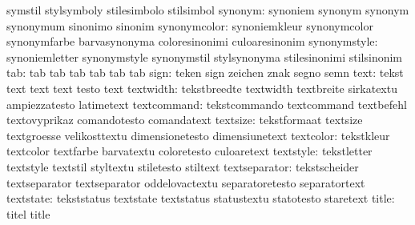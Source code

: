                            symstil                   stylsymboly
                           stilesimbolo              stilsimbol
                  synonym: synoniem                  synonym
                           synonym                   synonymum
                           sinonimo                  sinonim
             synonymcolor: synoniemkleur             synonymcolor
                           synonymfarbe              barvasynonyma
                           coloresinonimi            culoaresinonim
             synonymstyle: synoniemletter            synonymstyle
                           synonymstil               stylsynonyma
                           stilesinonimi             stilsinonim
                      tab: tab                       tab
                           tab                       tab
                           tab                       tab
                     sign: teken                     sign
                           zeichen                   znak
                           segno                     semn
                     text: tekst                     text
                           text                      text
                           testo                     text
                textwidth: tekstbreedte              textwidth
                           textbreite                sirkatextu
                           ampiezzatesto             latimetext
              textcommand: tekstcommando             textcommand
                           textbefehl                textovyprikaz
                           comandotesto              comandatext
                 textsize: tekstformaat              textsize
                           textgroesse               velikosttextu
                           dimensionetesto           dimensiunetext
                textcolor: tekstkleur                textcolor
                           textfarbe                 barvatextu
                           coloretesto               culoaretext
                textstyle: tekstletter               textstyle
                           textstil                  styltextu
                           stiletesto                stiltext
            textseparator: tekstscheider             textseparator
                           textseparator             oddelovactextu
                           separatoretesto           separatortext
                textstate: tekststatus               textstate
                           textstatus                statustextu
                           statotesto                staretext
                    title: titel                     title

